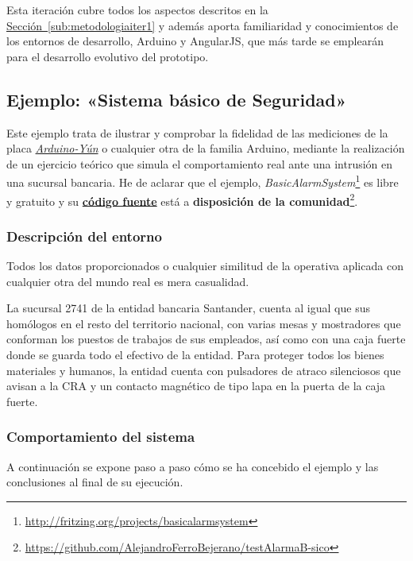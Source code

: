 Esta iteración cubre todos los aspectos descritos en la \hyperref[sub:metodologiaiter1]{Sección~\ref{sub:metodologiaiter1}} y además aporta familiaridad y conocimientos de los entornos de desarrollo, Arduino y AngularJS, que más tarde se emplearán para el desarrollo evolutivo del prototipo.

\subsection{Ejemplo: «Sistema básico de Seguridad»}

Este ejemplo trata de ilustrar y comprobar la fidelidad de las mediciones de la placa \hyperref[tab:arduino-yun]{\textit{Arduino-Yún}} o cualquier otra de la familia Arduino, mediante la realización de un ejercicio teórico que simula el comportamiento real ante una intrusión en una sucursal bancaria. He de aclarar que el ejemplo, \textit{BasicAlarmSystem}\footnote{\url{http://fritzing.org/projects/basicalarmsystem}} es libre y gratuito y su \href{https://github.com/AlejandroFerroBejerano/testAlarmaB-sico/blob/master/testAlarmaBasico.ino}{\textbf{código fuente}} está a \textbf{disposición de la comunidad}\footnote{\url{https://github.com/AlejandroFerroBejerano/testAlarmaB-sico}}. 

\subsubsection{Descripción del entorno}

Todos los datos proporcionados o cualquier similitud de la operativa aplicada con cualquier otra del mundo real es mera casualidad.

La sucursal 2741 de la entidad bancaria Santander, cuenta al igual que sus homólogos en el resto del territorio nacional, con varias mesas y mostradores que conforman los puestos de trabajos de sus empleados, así como con una caja fuerte donde se guarda todo el efectivo de la entidad. Para proteger todos los bienes materiales y humanos, la entidad cuenta con pulsadores de atraco silenciosos que avisan a la \acs{CRA} y un contacto magnético de tipo lapa en la puerta de la caja fuerte.

\subsubsection{Comportamiento del sistema}

A continuación se expone paso a paso cómo se ha concebido el ejemplo y las conclusiones al final de su ejecución. 

